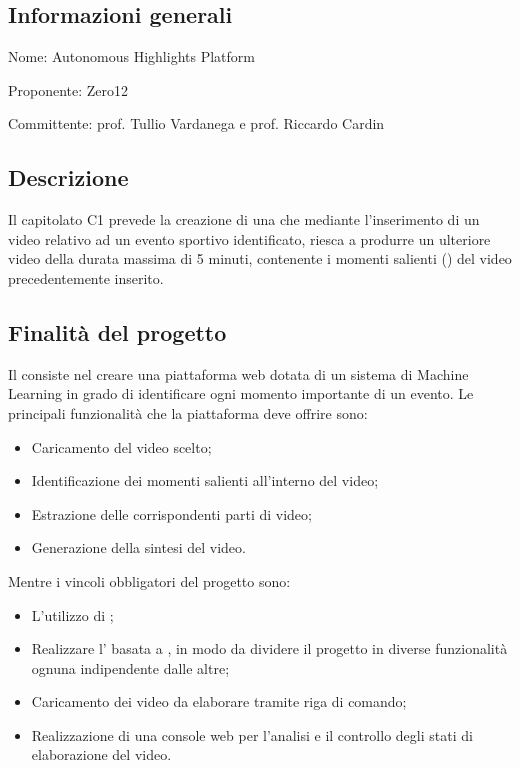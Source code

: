 \documentclass[../studio-di-fattibilita.tex]{subfiles}
\begin{document}
\subsection{Informazioni generali}%
\label{sub:informazioni_generale}
\begin{description}
  \item Nome: Autonomous Highlights Platform
  \item Proponente: Zero12
  \item Committente: prof. Tullio Vardanega e prof. Riccardo Cardin
\end{description}

\subsection{Descrizione}%
\label{sub:descrizione}
Il capitolato C1 prevede la creazione di una  che mediante l'inserimento di un video relativo ad un evento sportivo identificato, riesca a produrre un ulteriore video della durata massima di 5 minuti, contenente i momenti salienti () del video precedentemente inserito.

\subsection{Finalità del progetto}%
\label{sub:finalita_del_progetto}
Il  consiste nel creare una piattaforma web dotata di un sistema di Machine Learning in grado di identificare ogni momento importante di un evento.
Le principali funzionalità che la piattaforma deve offrire sono:
\begin{itemize}
  \item Caricamento del video scelto;
  \item Identificazione dei momenti salienti all'interno del video;
  \item Estrazione delle corrispondenti parti di video;
  \item Generazione della sintesi del video.
\end{itemize}
Mentre i vincoli obbligatori del progetto sono:
\begin{itemize}
  \item L'utilizzo di ;
  \item Realizzare l' basata a , in modo da dividere il progetto in diverse funzionalità ognuna indipendente dalle altre;
  \item Caricamento dei video da elaborare tramite riga di comando;
  \item Realizzazione di una console web per l'analisi e il controllo degli stati di elaborazione del video.
\end{itemize}
\end{document}
